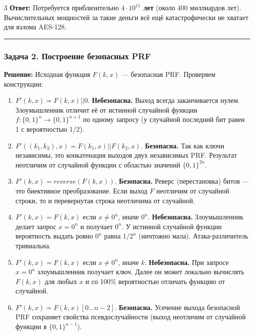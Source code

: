 ﻿\documentclass[9pt,a4paper,landscape]{extarticle}
\newcommand{\tightlist}{}
\begin{document}
\begin{multicols*}{3}
\textbf{Ответ:} Потребуется приблизительно \textbf{\(4 \cdot 10^{11}\) лет} (около 400 миллиардов лет). Вычислительных мощностей за такие деньги всё ещё катастрофически не хватает для взлома AES-128.

\begin{center}\rule{0.5\linewidth}{0.5pt}\end{center}

\subsubsection{Задача 2. Построение безопасных PRF}\label{ux437ux430ux434ux430ux447ux430-2.-ux43fux43eux441ux442ux440ux43eux435ux43dux438ux435-ux431ux435ux437ux43eux43fux430ux441ux43dux44bux445-prf}

\textbf{Решение:} Исходная функция \(F(k, x)\) --- безопасная PRF. Проверяем конструкции:

\begin{enumerate}
\def\labelenumi{\arabic{enumi}.}
\tightlist
\item
  \(F'(k, x) = F(k, x) || 0\). \textbf{Небезопасна.} Выход всегда заканчивается нулем. Злоумышленник отличит её от истинной случайной функции \(f: \{0,1\}^n \to \{0,1\}^{n+1}\) по одному запросу (у случайной последний бит равен 1 с вероятностью 1/2).
\item
  \(F'((k_1, k_2), x) = F(k_1, x) || F(k_2, x)\). \textbf{Безопасна.} Так как ключи независимы, это конкатенация выходов двух независимых PRF. Результат неотличим от случайной функции с областью значений \(\{0,1\}^{2n}\).
\item
  \(F'(k, x) = reverse(F(k, x))\). \textbf{Безопасна.} Реверс (перестановка) битов --- это биективное преобразование. Если выход \(F\) неотличим от случайной строки, то и перевернутая строка неотличима от случайной.
\item
  \(F'(k, x) = F(k, x)\) если \(x \neq 0^n\), иначе \(0^n\). \textbf{Небезопасна.} Злоумышленник делает запрос \(x = 0^n\) и получает \(0^n\). У истинной случайной функции вероятность выдать ровно \(0^n\) равна \(1/2^n\) (ничтожно мала). Атака-различитель тривиальна.
\item
  \(F'(k, x) = F(k, x)\) если \(x \neq 0^n\), иначе \(k\). \textbf{Небезопасна.} При запросе \(x = 0^n\) злоумышленник получает ключ. Далее он может локально вычислять \(F(k, x)\) для любых \(x\) и со 100\% вероятностью отличать функцию от случайной.
\item
  \(F'(k, x) = F(k, x)[0 \dots n-2]\). \textbf{Безопасна.} Усечение выхода безопасной PRF сохраняет свойства псевдослучайности (выход неотличим от случайной функции в \(\{0,1\}^{n-1}\)).
\end{enumerate}


\end{multicols*}
\end{document}
